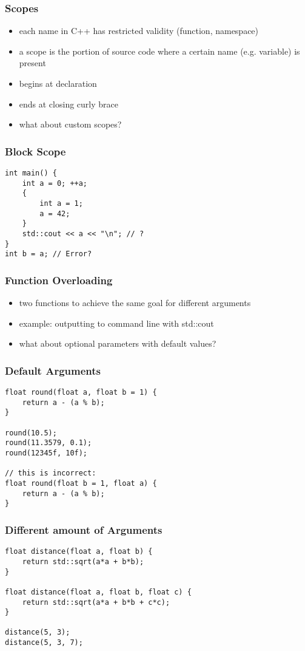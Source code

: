 \begin{frame}[fragile]
    \frametitle{Scopes}
    \begin{itemize}
        \item each name in C++ has restricted validity (function, namespace)
        \item a scope is the portion of source code where a certain name (e.g. variable) is present
        \item begins at declaration
        \item ends at closing curly brace
        \item what about custom scopes?
    \end{itemize}
\end{frame}

\begin{frame}[fragile]
    \frametitle{Block Scope}
    \begin{lstlisting}
int main() {
    int a = 0; ++a;
    {
        int a = 1;
        a = 42;
    }
    std::cout << a << "\n"; // ?
}
int b = a; // Error?
    \end{lstlisting}
\end{frame}

\begin{frame}[fragile]
    \frametitle{Function Overloading}
    \begin{itemize}
        \item two functions to achieve the same goal for different arguments
        \item example: outputting to command line with std::cout
        \item what about optional parameters with default values?
    \end{itemize}
\end{frame}

\begin{frame}[fragile]
    \frametitle{Default Arguments}
    \begin{lstlisting}
float round(float a, float b = 1) {
    return a - (a % b);
}

round(10.5);
round(11.3579, 0.1);
round(12345f, 10f);

// this is incorrect:
float round(float b = 1, float a) {
    return a - (a % b);
}
    \end{lstlisting}
\end{frame}

\begin{frame}[fragile]
    \frametitle{Different amount of Arguments}
    \begin{lstlisting}
float distance(float a, float b) {
    return std::sqrt(a*a + b*b);
}

float distance(float a, float b, float c) {
    return std::sqrt(a*a + b*b + c*c);
}

distance(5, 3);
distance(5, 3, 7);
    \end{lstlisting}
\end{frame}

